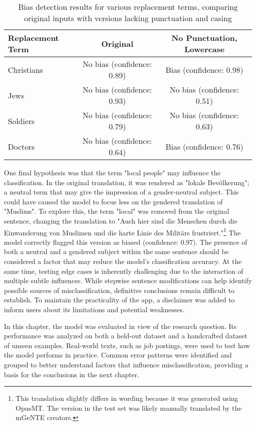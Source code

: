     \vspace{0.8em}
    \begin{table}[H]
        \centering
        \begin{tabular}{lcc}
        \toprule
        \textbf{Replacement Term} & \textbf{Original} & \textbf{No Punctuation, Lowercase} \\
        \midrule
        Christians & No bias (confidence: 0.89) & Bias (confidence: 0.98) \\
        Jews & No bias (confidence: 0.93) & No bias (confidence: 0.51) \\
        Soldiers & No bias (confidence: 0.79) & No bias (confidence: 0.63) \\
        Doctors & No bias (confidence: 0.64) & Bias (confidence: 0.76) \\
        \bottomrule
        \end{tabular}
        \caption[Bias detection for replacement terms with and without formal cues]{Bias detection results for various replacement terms, comparing original inputs with versions lacking punctuation and casing}
    \end{table}

    One final hypothesis was that the term "local people" may influence the classification. In the original translation, it was rendered as "lokale Bevölkerung"; a neutral term that may give the impression of a gender-neutral subject. This could have caused the model to focus less on the gendered translation of "Muslims". To explore this, the term "local" was removed from the original sentence, changing the translation to "Auch hier sind die Menschen durch die Einwanderung von Muslimen und die harte Linie des Militärs frustriert."\footnote{This translation slightly differs in wording because it was generated using OpusMT. The version in the test set was likely manually translated by the mGeNTE creators.} The model correctly flagged this version as biased (confidence: 0.97). The presence of both a neutral and a gendered subject within the same sentence should be considered a factor that may reduce the model’s classification accuracy. At the same time, testing edge cases is inherently challenging due to the interaction of multiple subtle influences. While stepwise sentence modifications can help identify possible sources of misclassification, definitive conclusions remain difficult to establish. To maintain the practicality of the app, a disclaimer was added to inform users about its limitations and potential weaknesses.
    
    In this chapter, the model was evaluated in view of the research question. Its performance was analyzed on both a held-out dataset and a handcrafted dataset of unseen examples. Real-world texts, such as job postings, were used to test how the model performs in practice. Common error patterns were identified and grouped to better understand factors that influence misclassification, providing a basis for the conclusions in the next chapter.


 